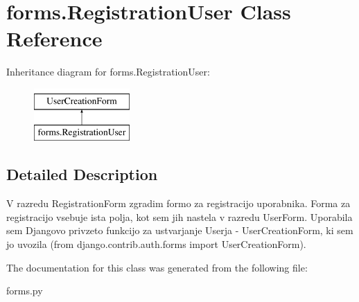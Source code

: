 \section{forms.\+Registration\+User Class Reference}
\label{classforms_1_1_registration_user}
Inheritance diagram for forms.\+Registration\+User\+:\begin{figure}[H]
\begin{center}
\leavevmode
\includegraphics[height=2.000000cm]{classforms_1_1_registration_user}
\end{center}
\end{figure}


\subsection{Detailed Description}
\begin{DoxyVerb}    V razredu RegistrationForm zgradim formo za registracijo uporabnika. Forma za registracijo vsebuje ista polja, kot sem jih nastela v razredu UserForm.
    Uporabila sem Djangovo privzeto funkcijo za ustvarjanje Userja - UserCreationForm, ki sem jo uvozila (from django.contrib.auth.forms import UserCreationForm).
\end{DoxyVerb}
 

The documentation for this class was generated from the following file\+:\begin{DoxyCompactItemize}
\item 
forms.\+py\end{DoxyCompactItemize}
